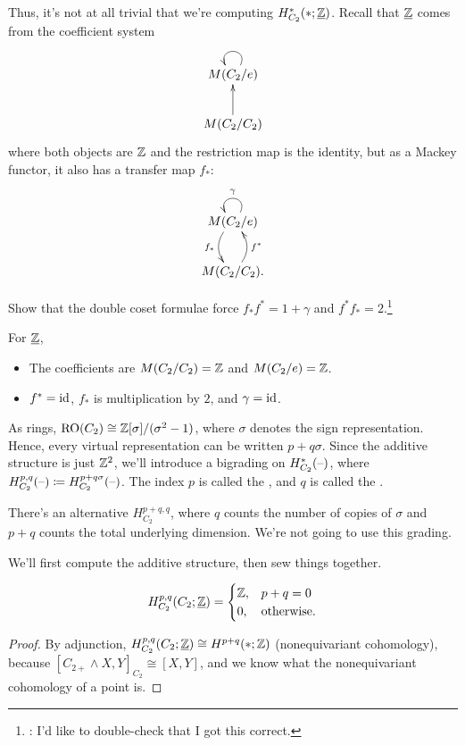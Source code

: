 Thus, it's not at all trivial that we're computing $H_{C_2}^*(*;\underline{\mathbb Z})$. Recall that $\underline{\mathbb Z}$ comes
from the coefficient system
\[\xymatrix{
	M(C_2/e)\ar@(ur,ul)_{}\\
	M(C_2/C_2)\ar[u],
}\]
where both objects are $\mathbb Z$ and the restriction map is the identity, but as a Mackey functor, it also has a
transfer map $f_*$:
\[\xymatrix{
	M(C_2/e)\ar@/_0.4cm/[d]_{f_*}\ar@(ur,ul)_\gamma\\
	M(C_2/C_2).\ar@/_0.4cm/[u]_{f^*}
}\]
\begin{ex}
Show that the double coset formulae force $f_*f^* = 1+\gamma$ and $f^*f_* = 2$.\footnote{\TODO: I'd like to
double-check that I got this correct.}
\end{ex}
For $\underline{\mathbb Z}$,
\begin{itemize}
	\item The coefficients are $M(C_2/C_2) = \mathbb Z$ and $M(C_2/e) = \mathbb Z$.
	\item $f^* = \mathrm{id}$, $f_*$ is multiplication by $2$, and $\gamma = \mathrm{id}$.
\end{itemize}
As rings, $\mathrm{RO}(C_2)\cong\mathbb Z[\sigma]/(\sigma^2-1)$, where $\sigma$ denotes the sign representation. Hence, every virtual representation can be written $p+q\sigma$. Since
the additive structure is just $\mathbb Z^2$, we'll introduce a bigrading on $H^*_{C_2}(\text{--})$, where $H_{C_2}^{p,q}(\text{--})
\coloneqq H_{C_2}^{p+q\sigma}(\text{--})$. The index $p$ is called the
, and $q$ is called the
.
\begin{rem}
There's an alternative  $H_{C_2}^{p+q,q}$, where $q$ counts
the number of copies of $\sigma$ and $p+q$ counts the total underlying dimension. We're not going to use this
grading.
\end{rem}
We'll first compute the additive structure, then sew things together.
\begin{lem}
\[H_{C_2}^{p,q}(C_2; \underline{\mathbb Z}) = \begin{cases}
	\mathbb Z, &p+q=0\\
	0, &\text{\rm otherwise.}
\end{cases}\]
\end{lem}
\begin{proof}
By adjunction, $H_{C_2}^{p,q}(C_2;\underline{\mathbb Z})\cong H^{p+q}(*;\mathbb Z)$ (nonequivariant cohomology), because
$[C_{2+}\wedge X, Y]_{C_2}\cong [X,Y]$, and we know what the nonequivariant cohomology of a point is.
\end{proof}
